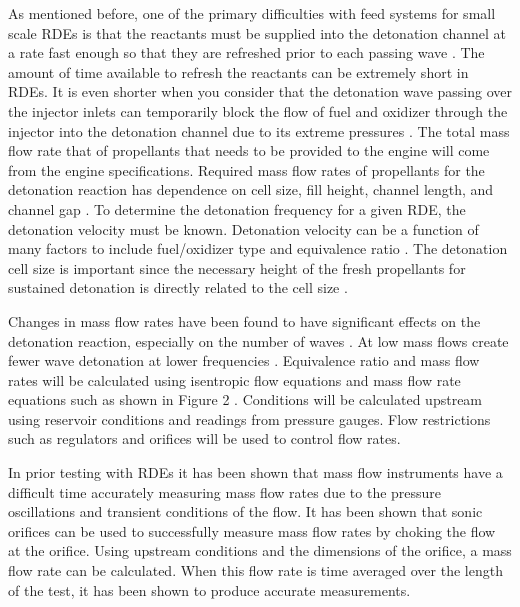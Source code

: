 As mentioned before, one of the primary difficulties with feed systems for small scale RDEs is that the reactants must be supplied into the detonation channel at a rate fast enough so that they are refreshed prior to each passing wave \cite{dechert:2020, fiorino:2021, fiorino:2022}. The amount of time available to refresh the reactants can be extremely short in RDEs. It is even shorter when you consider that the detonation wave passing over the injector inlets can temporarily block the flow of fuel and oxidizer through the injector into the detonation channel due to its extreme pressures \cite{dechert:2020}. The total mass flow rate that of propellants that needs to be provided to the engine will come from the engine specifications. Required mass flow rates of propellants for the detonation reaction has dependence on cell size, fill height, channel length, and channel gap \cite{dechert:2020, fiorino:2021, connolly-boutin:2021, bykovskii:2012}. To determine the detonation frequency for a given RDE, the detonation velocity must be known. Detonation velocity can be a function of many factors to include fuel/oxidizer type and equivalence ratio \cite{dechert:2020, bykovskii:2012}. The detonation cell size is important since the necessary height of the fresh propellants for sustained detonation is directly related to the cell size \cite{bykovskii:2012, russo:2011}.

Changes in mass flow rates have been found to have significant effects on the detonation reaction, especially on the number of waves \cite{law:2021}. At low mass flows create fewer wave detonation at lower frequencies \cite{fiorino:2022, law:2021}. Equivalence ratio and mass flow rates will be calculated using isentropic flow equations and mass flow rate equations such as shown in Figure 2 \cite{nasa-mass-flow-choking:2021, nasa-mass-flow-equations:2021}. Conditions will be calculated upstream using reservoir conditions and readings from pressure gauges. Flow restrictions such as regulators and orifices will be used to control flow rates.

In prior testing with RDEs it has been shown that mass flow instruments have a difficult time accurately measuring mass flow rates due to the pressure oscillations and transient conditions of the flow. It has been shown that sonic orifices can be used to successfully measure mass flow rates by choking the flow at the orifice. Using upstream conditions and the dimensions of the orifice, a mass flow rate can be calculated. When this flow rate is time averaged over the length of the test, it has been shown to produce accurate measurements.

